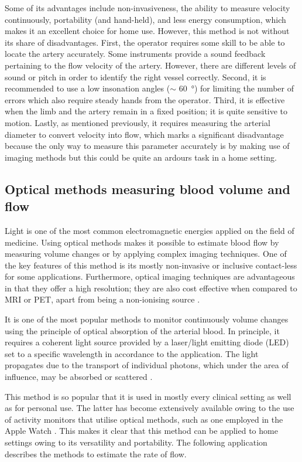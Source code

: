 Some of its advantages include non-invasiveness, the ability to measure velocity continuously, portability (and hand-held), and less energy consumption, which makes it an excellent choice for home use. However, this method is not without its share of disadvantages. First, the operator requires some skill to be able to locate the artery accurately. Some instruments provide a sound feedback pertaining to the flow velocity of the artery. However, there are different levels of sound or pitch in order to identify the right vessel correctly. Second, it is recommended to use a low insonation angles ($\sim$ \SI{60}{\degree}) for limiting the number of errors \cite{raadegran1999limb} which also require steady hands from the operator. Third, it is effective when the limb and the artery remain in a fixed position; it is quite sensitive to motion. Lastly, as mentioned previously, it requires measuring the arterial diameter to convert velocity into flow, which marks a significant disadvantage because the only way to measure this parameter accurately is by making use of imaging methods \cite{chapter4bloodflow} but this could be quite an ardours task in a home setting.

\subsection{Optical methods measuring blood volume and flow}
\label{section literature Optic}
Light is one of the most common electromagnetic energies applied on the field of medicine. Using optical methods makes it possible to estimate blood flow by measuring volume changes or by applying complex imaging techniques. One of the key features of this method is its mostly non-invasive or inclusive contact-less for some applications. Furthermore, optical imaging techniques are advantageous in that they offer a high resolution; they are also cost effective when compared to MRI or PET, apart from being a non-ionising source \cite{jayanthy2011measuring}.

It is one of the most popular methods to monitor continuously volume changes using the principle of optical absorption of the arterial blood. In principle, it requires a coherent light source provided by a laser/light emitting diode (LED) set to a specific wavelength in accordance to the application. The light propagates due to the transport of individual photons, which under the area of influence, may be absorbed or scattered \cite{schmitt2003quantitative}. 

This method is so popular that it is used in mostly every clinical setting as well as for personal use. The latter has become extensively available owing to the use of activity monitors that utilise optical methods, such as one employed in the Apple Watch \cite{culbert2017user}. This makes it clear that this method can be applied to home settings owing to its versatility and portability. The following application describes the methods to estimate the rate of flow. 

